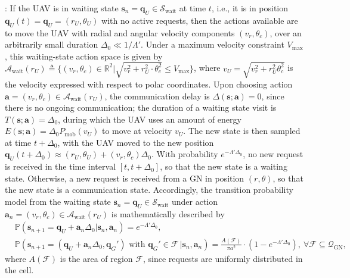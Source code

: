 \documentclass[12pt, draftcls, onecolumn]{IEEEtran}
\theoremstyle{plain}
\theoremstyle{definition}
\theoremstyle{remark}
\begin{document}
: If the UAV is in {waiting} state $\mathbf{s}_{n}{=}\mathbf{q}_{U}{\in}\mathcal{S}_{\mathrm{wait}}$ at time $t$, i.e., it is in position $\mathbf{q}_{U}(t){=}\mathbf{q}_{U}{=}(r_{U},\theta_{U})$ with no active requests, then the actions available are to move the UAV with radial and angular velocity components $(v_{r},\theta_{c})$, over an arbitrarily small duration $\Delta_{0}{\ll}1/\Lambda'$. Under a maximum velocity constraint $V_{\mathrm{max}}$, this waiting-state action space is given by $\mathcal{A}_{\mathrm{wait}}(r_{U}){\triangleq}\Big\{(v_{r},\theta_{c}){\in}\mathbb{R}^{2}\Big|\sqrt{v_{r}^{2}{+}r_{U}^{2}{\cdot}\theta_{c}^{2}}{\leq}V_{\mathrm{max}} \Big\}$, where $v_{U}{=}\sqrt{v_{r}^{2}{+}r_{U}^{2}\theta_{c}^{2}}$ is the velocity expressed with respect to polar coordinates. Upon choosing action $\mathbf{a}{=}(v_{r},\theta_{c}){\in}\mathcal{A}_{\mathrm{wait}}(r_{U})$, the communication delay is $\Delta(\mathbf{s};\mathbf{a}){=}0$, since there is no ongoing communication; the duration of a waiting state visit is $T(\mathbf{s};\mathbf{a}){=}\Delta_{0}$, during which the UAV uses an amount of energy $E(\mathbf{s};\mathbf{a}){=}\Delta_{0}P_{\mathrm{mob}} \left(v_{U}\right)$ to move at velocity $v_{U}$. The new state is then sampled at time $t{+}\Delta_{0}$, with the UAV moved to the new position $\mathbf{q}_{U}(t{+}\Delta_{0}){\approx}(r_{U},\theta_{U}){+}(v_{r},\theta_{c})\Delta_{0}$. With probability $e^{-\Lambda'\Delta_{0}}$, no new request is received in the time interval $[t,t{+}\Delta_{0}]$, so that the new state is a waiting state.  Otherwise, a new request is received from a GN in position $(r,\theta)$, so that the new state is a communication state. Accordingly, the transition probability model from the waiting state $\mathbf{s}_{n}{=}\mathbf{q}_{U}{\in}\mathcal{S}_\mathrm{wait}$ under action $\mathbf{a}_{n}{=}(v_{r},\theta_{c}){\in}\mathcal{A}_{\mathrm{wait}}(r_{U})$ is mathematically described by
\begin{align}\label{eq:CommTransProb}
    &\mathbb{P}(\mathbf{s}_{n+1}=\mathbf q_U+\mathbf a_n\Delta_0|\mathbf{s}_n,\mathbf{a}_n) = e^{-\Lambda'\Delta_{0}},\\\nonumber
    &\mathbb{P}(\mathbf{s}_{n+1}=(\mathbf q_U+\mathbf a_n\Delta_0,\mathbf q_G') \text{ with } \mathbf q_G' \in \mathcal{F} \,|\mathbf{s}_n,\mathbf{a}_n) =\frac{A(\mathcal{F})}{\pi a^2} \cdot (1-e^{-\Lambda'\Delta_{0}}),\ \forall \mathcal{F}\subseteq \mathcal{Q}_{\mathrm{GN}},
\end{align}
where $A(\mathcal{F})$ is the area of region $\mathcal{F}$, since requests are uniformly distributed in the cell.
\end{document}
